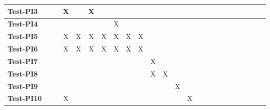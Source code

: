 \documentclass[12pt, titlepage]{article}
\begin{document}
\begin{landscape}
\begin{table}[H]
\begin{adjustwidth}{-0.1in}{-1in}
{\begin{tabular}{|c|c|c|c|c|c|c|c|c|c|c|c|c|c|c|c|c|c|c|c|c|c|c|c|}
\multicolumn{1}{|l|}{\textbf{Test-PI3}}   &             &              &X             &              &X             &             &             &             &              &              &             &             &              &             &              &                & & & & & & &\\ \hline
\multicolumn{1}{|l|}{\textbf{Test-PI4}}   &             &              &             &              &             &             &X             &             &              &              &             &             &              &             &              &                & & & & & & &\\ \hline
\multicolumn{1}{|l|}{\textbf{Test-PI5}}   &             &              &X             &X              &X             &X             &X             &X             &X              &              &             &             &              &             &              &                & & & & & & &\\ \hline
\multicolumn{1}{|l|}{\textbf{Test-PI6}}  &             &              &X             &X              &X             &X             &X             &X             &X              &              &             &             &              &             &              &                & & & & & & &\\ \hline
\multicolumn{1}{|l|}{\textbf{Test-PI7}}   &             &              &             &              &             &             &             &             &              &X              &             &             &              &             &              &                & & & & & & &\\ \hline
\multicolumn{1}{|l|}{\textbf{Test-PI8}}   &             &              &             &              &             &             &             &             &              &X              &X             &             &              &             &              &                & & & & & & &\\ \hline
\multicolumn{1}{|l|}{\textbf{Test-PI9}}   &             &              &             &              &             &             &             &             &              &              &             &X             &              &             &              &                & & & & & & &\\ \hline
\multicolumn{1}{|l|}{\textbf{Test-PI10}}   &             &              &X             &              &             &             &             &             &              &              &             &             &X              &             &              &                & & & & & & &\\ \hline

\end{tabular}}
\end{adjustwidth}
\end{table}
\end{landscape}
\end{document}
